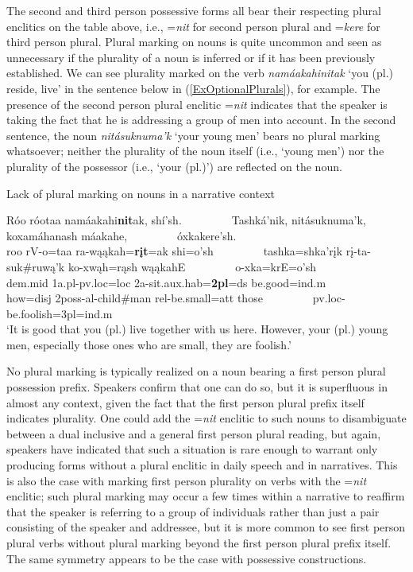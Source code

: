 The second and third person possessive forms all bear their respecting plural enclitics on the table above, i.e., =\textit{nit} for second person plural and =\textit{kere} for third person plural. Plural marking on nouns is quite uncommon and seen as unnecessary if the plurality of a noun is inferred or if it has been previously established. We can see plurality marked on the verb \textit{namáakahinitak} `you (pl.) reside, live' in the sentence below in (\ref{ExOptionalPlurals}), for example. The presence of the second person plural enclitic =\textit{nit} indicates that the speaker is taking the fact that he is addressing a group of men into account. In the second sentence, the noun \textit{nitásuknuma'k} `your young men' bears no plural marking whatsoever; neither the plurality of the noun itself (i.e., `young men') nor the plurality of the possessor (i.e., `your (pl.)') are reflected on the noun.

\begin{exe}

\item\label{ExOptionalPlurals} Lack of plural marking on nouns in a narrative context

\glll Róo róotaa namáakahi\textbf{nit}ak, shí'sh. ~ ~ ~ ~ ~ Tashká'nik, nitásuknuma'k, koxamáhanash máakahe, ~ ~ ~ ~ ~ óxkakere'sh.\\
    roo rV-o=taa ra-wąąkah=\textbf{rįt}=ak shi=o'sh ~ ~ ~ ~ ~  tashka=shka'rįk rį-ta-suk\#ruwą'k ko-xwąh=rąsh wąąkahE ~ ~ ~ ~ ~ o-xka=krE=o'sh\\
    dem.mid 1a.pl-pv.loc=loc 2a-\textnormal{sit}.aux.hab=\textbf{2pl}=ds \textnormal{be.good}=ind.m ~ ~ ~ ~ ~ \textnormal{how}=disj 2poss-al-\textnormal{child}\#\textnormal{man} rel-\textnormal{be.small}=att \textnormal{those} ~ ~ ~ ~ ~ pv.loc-\textnormal{be.foolish}=3pl=ind.m\\
    \glt `It is good that you (pl.) live together with us here. However, your (pl.) young men, especially those ones who are small, they are foolish.' \citep[205f]{trechter2012}

\end{exe}

No plural marking is typically realized on a noun bearing a first person plural possession prefix. Speakers confirm that one can do so, but it is superfluous in almost any context, given the fact that the first person plural prefix itself indicates plurality. One could add the =\textit{nit} enclitic to such nouns to disambiguate between a dual inclusive and a general first person plural reading, but again, speakers have indicated that such a situation is rare enough to warrant only producing forms without a plural enclitic in daily speech and in narratives. This is also the case with marking first person plurality on verbs with the =\textit{nit} enclitic; such plural marking may occur a few times within a narrative to reaffirm that the speaker is referring to a group of individuals rather than just a pair consisting of the speaker and addressee, but it is more common to see first person plural verbs without plural marking beyond the first person plural prefix itself. The same symmetry appears to be the case with possessive constructions.

